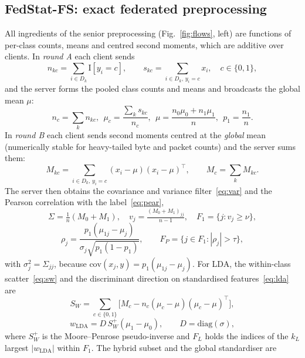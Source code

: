 \subsection{FedStat-FS: exact federated preprocessing}
All ingredients of the senior preprocessing (Fig.~\ref{fig:flows}, left) are functions of per-class counts, means and centred second moments, which are additive over clients. In \emph{round A} each client sends
\begin{equation}\label{eq:A}
n_{kc}=\sum_{i\in D_k}\mathrm{I}[y_i=c],\qquad s_{kc}=\sum_{i\in D_k,\,y_i=c}x_i,\quad c\in\{0,1\},
\end{equation}
and the server forms the pooled class counts and means and broadcasts the global mean $\mu$:
\begin{equation}\label{eq:A2}
n_c=\sum_k n_{kc},\ \ \mu_c=\frac{\sum_k s_{kc}}{n_c},\ \ \mu=\frac{n_0\mu_0+n_1\mu_1}{n},\ \ p_1=\frac{n_1}{n}.
\end{equation}
In \emph{round B} each client sends second moments centred at the \emph{global} mean (numerically stable for heavy-tailed byte and packet counts) and the server sums them:
\begin{equation}\label{eq:B}
M_{kc}=\!\!\sum_{i\in D_k,\,y_i=c}\!\!(x_i-\mu)(x_i-\mu)^{\!\top},\qquad M_c=\sum_k M_{kc}.
\end{equation}
The server then obtains the covariance and variance filter~\eqref{eq:var} and the Pearson correlation with the label~\eqref{eq:pear},
\begin{equation}\label{eq:var}
\Sigma=\tfrac1n(M_0+M_1),\quad v_j=\tfrac{(M_0+M_1)_{jj}}{n-1},\quad F_1=\{j:v_j\ge\nu\},
\end{equation}
\begin{equation}\label{eq:pear}
\rho_j=\frac{p_1(\mu_{1j}-\mu_j)}{\sigma_j\sqrt{p_1(1-p_1)}},\qquad F_P=\{j\in F_1:|\rho_j|>\tau\},
\end{equation}
with $\sigma_j^2=\Sigma_{jj}$, because $\mathrm{cov}(x_j,y)=p_1(\mu_{1j}-\mu_j)$. For LDA, the within-class scatter~\eqref{eq:sw} and the discriminant direction on standardised features~\eqref{eq:lda} are
\begin{equation}\label{eq:sw}
S_W=\sum_{c\in\{0,1\}}\big[M_c-n_c(\mu_c-\mu)(\mu_c-\mu)^{\!\top}\big],
\end{equation}
\begin{equation}\label{eq:lda}
w_{\mathrm{LDA}}=D\,S_W^{+}(\mu_1-\mu_0),\qquad D=\mathrm{diag}(\sigma),
\end{equation}
where $S_W^{+}$ is the Moore--Penrose pseudo-inverse and $F_L$ holds the indices of the $k_L$ largest $|w_{\mathrm{LDA}}|$ within $F_1$. The hybrid subset and the global standardiser are
